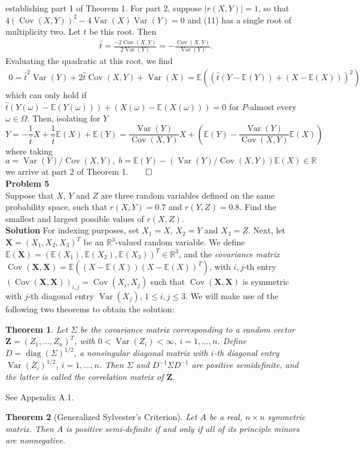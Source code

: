 \documentclass[10pt]{article}
\newcommand{\bs}[1]{\boldsymbol{#1}}
\newcommand{\E}{\mathbb{E}}
\newcommand{\bp}[1]{\left({#1}\right)}
\newcommand{\mbb}[1]{\mathbb{#1}}
\newcommand{\1}[1]{\mathbbm{1}_{#1}}
\DeclareMathOperator{\Var}{Var}
\DeclareMathOperator{\Cov}{Cov}
\DeclareMathOperator{\diag}{diag}
\newtheorem{theorem}{Theorem}
\begin{document}
    establishing part 1 of Theorem 1. For part 2, suppose $|r(X,Y)|=1$, so that $4(\Cov(X,Y))^2-4\Var(X)\Var(Y)=0$ and (11) has a single root of multiplicity two. Let $\hat{t}$ be this root. Then
    \begin{align*}
        \hat{t}=\frac{-2\Cov(X,Y)}{2\Var(Y)}=-\frac{\Cov(X,Y)}{\Var(Y)}.
    \end{align*}
    Evaluating the quadratic at this root, we find
    \begin{align*}
        0=\hat{t}^2\Var(Y)+2\hat{t}\Cov(X,Y)+\Var(X)=\E((\hat{t}(Y-\E(Y))+(X-\E(X)))^2)
    \end{align*}
    which can only hold if $\hat{t}(Y(\omega)-\E(Y(\omega)))+(X(\omega)-\E(X(\omega)))=0$ for $P$-almost every $\omega\in\Omega$. Then, isolating for $Y$
    \[Y=-\frac{1}{\hat{t}}X+\frac{1}{\hat{t}}\E(X)+\E(Y)=\frac{\Var(Y)}{\Cov(X,Y)}X+\bp{\E(Y)-\frac{\Var(Y)}{\Cov(X,Y)}\E(X)}\]
    where taking $a=\Var(Y)/\Cov(X,Y),\;b=\E(Y)-(\Var(Y)/\Cov(X,Y))\E(X)\in\mbb{R}$ we arrive at part 2 of Theorem 1.\hfill{$\qed$}\\[5pt]
    {\bf Problem 5}\\[5pt]
    Suppose that $X$, $Y$ and $Z$ are three random variables defined on the same probability space, such that $r(X,Y)=0.7$ and $r(Y,Z)=0.8$. Find the smallest and largest possible
    values of $r(X,Z)$.\\[5pt]
    {\bf Solution}\hspace{5pt}
    For indexing purposes, set $X_1=X$, $X_2=Y$ and $X_3=Z$. Next, let $\bs{X}=(X_1,X_2,X_3)^T$ be an $\mbb{R}^3$-valued random variable. We define $\E(\bs{X})=(\E(X_1),\E(X_2),\E(X_3))^T\in\mbb{R}^3$, and
    the {\it covariance matrix} $\Cov(\bs{X},\bs{X})=\E((X-\E(X))(X-\E(X))^T)$, with $i,j$-th entry $(\Cov(\bs{X},\bs{X}))_{i,j}=\Cov(X_i,X_j)$ such that $\Cov(\bs{X},\bs{X})$ is symmetric with $j$-th diagonal entry $\Var(X_j)$, $1\leq i,j\leq 3$.
    We will make use of the following two theorems to obtain the solution:
    \begin{theorem}
        Let $\Sigma$ be the covariance matrix corresponding to a random vector $\bs{Z}=(Z_1,\dots,Z_n)^T$, with $0<\Var(Z_i)<\infty$, $i=1,\dots,n$. Define $D=\diag(\Sigma)^{1/2}$, a nonsingular diagonal matrix with $i$-th diagonal entry $\Var(Z_i)^{1/2}$, $i=1,\dots,n$. Then $\Sigma$ and $D^{-1}\Sigma D^{-1}$ are positive semidefinite,
        and the latter is called the correlation matrix of $\bs{Z}$.
    \end{theorem}
     See Appendix A.1.
    \begin{theorem}[Generalized Sylvester's Criterion]
        Let $A$ be a real, $n\times n$ symmetric matrix. Then $A$ is positive semi-definite if and only if all of its principle minors are nonnegative.
    \end{theorem}
\end{document}

